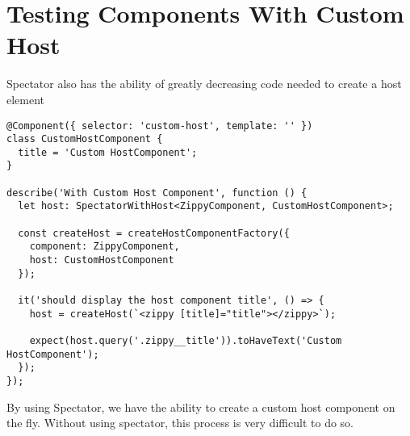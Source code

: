 \section{ Testing Components With Custom Host }
Spectator also has the ability of greatly decreasing code needed to create a
host element

\begin{lstlisting}
@Component({ selector: 'custom-host', template: '' })
class CustomHostComponent {
  title = 'Custom HostComponent';
}

describe('With Custom Host Component', function () {
  let host: SpectatorWithHost<ZippyComponent, CustomHostComponent>;

  const createHost = createHostComponentFactory({
    component: ZippyComponent,
    host: CustomHostComponent
  });

  it('should display the host component title', () => {
    host = createHost(`<zippy [title]="title"></zippy>`);

    expect(host.query('.zippy__title')).toHaveText('Custom HostComponent');
  });
});
\end{lstlisting}

By using Spectator, we have the ability to create a custom host component on
the fly. Without using spectator, this process is very difficult to do so. 
